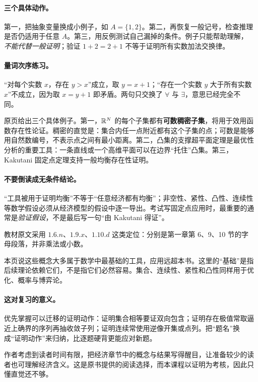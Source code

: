 \paragraph{三个具体动作。}第一，把抽象变量换成小例子，如 $A=\{1,2\}$。第二，再恢复一般记号，检查推理是否仍适用于任意 $A$。第三，用反例测试自己漏掉的条件。例子只能帮助理解，\emph{不能代替一般证明}；验证 $1+2=2+1$ 不等于证明所有实数加法交换律。

\paragraph{量词次序练习。}“对每个实数 $x$，存在 $y>x$”成立，取 $y=x+1$；“存在一个实数 $y$ 大于所有实数 $x$”不成立，因为取 $x=y+1$ 即矛盾。两句只交换了 $\forall$ 与 $\exists$，意思已经完全不同。

原页给出三个具体例子。第一，$\mathbb{R}^N$ 的每个子集都有\textbf{可数稠密子集}，将用于效用函数存在性论证。稠密的直觉是：集合内任一点附近都有这个子集的点；可数是能够用自然数编号，不表示点之间有最小距离。第二，凸集的支撑超平面定理是最优性分析的重要工具：一条直线或一个高维平面可以在边界“托住”凸集。第三，Kakutani 固定点定理支持一般均衡存在性证明。

\paragraph{不要倒读成无条件结论。}“工具被用于证明均衡”不等于“任意经济都有均衡”；非空性、紧性、凸性、连续性等数学假设必须从经济模型的假设中逐一导出。考试写固定点应用时，最重要的通常是\emph{验证假设}，不是最后写一句“由 Kakutani 得证”。

教材原文采用 $1.6.n$、$1.9.x$、$1.10.d$ 这类定位：分别是第一章第 6、9、10 节的字母段落，并非乘法或小数。

本页说这些概念大多属于数学中最基础的工具，应用远超本书。这里的“基础”是指后续理论依赖它们，不是指它们必然容易。集合、连续性、紧性和凸性同样用于优化、概率与博弈论。

\paragraph{这对复习的意义。}优先掌握可以迁移的证明动作：证明集合相等要证双向包含；证明存在极值常取逼近上确界的序列再抽收敛子列；证明连续常使用逆像开集或点列。把“题名”换成“证明动作”来归纳，比逐题硬背更能应对新题。

作者考虑到读者时间有限，把经济章节中的概念与结果写得醒目，让准备较少的读者也可理解经济含义。这是原书提供的阅读选择，而本课程以证明为考核，因此只懂直觉还不够。

